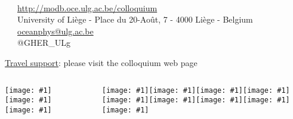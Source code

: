 \documentclass[final,table,14pt,aspectratio=141]{beamer}
\newcommand{\seplogo}{\hspace{.25cm}}
\newcommand{\figheight}{.05\textheight}
\newcommand{\putlogo}[1]{\texttt{[image: \#1]}}
\begin{document}
\begin{frame}[fragile]
\begin{columns}[totalwidth=1.\textwidth,c]
\end{columns}


\vspace{-0.02\textheight}
{ \rmfamily \tiny
\textcolor{greygher}{\faCalendarCheckO~~~\insertdate}\\
\textcolor{bluegher}{{\ComputerMouse}~~~\url{http://modb.oce.ulg.ac.be/colloquium}}\\
\textcolor{greygher}{\faHome~~~University of Liège - Place du 20-Août, 7 - 4000 Liège - Belgium}\\ 
\textcolor{bluegher}{\Letter}~~~\href{mailto:oceanphys@ulg.ac.be}{oceanphys@ulg.ac.be}\\
\textcolor{greygher}{\faTwitter~~~@GHER\_ULg}\\
}

\vspace{.05cm}
{\scriptsize 
{}
}

{\scriptsize 
\href{http://modb.oce.ulg.ac.be/colloquium/2016/#col_travel_grants}{Travel support}: please visit the colloquium web page
}

\vfill

\begin{columns}[totalwidth=1.\textwidth,c]

\scriptsize


\putlogo{logo_gher}\seplogo\putlogo{logo_imedea}\seplogo\putlogo{logo_whoi} %

~

\scriptsize
\putlogo{coq_wallon}\seplogo\putlogo{logo_IOC}\seplogo\putlogo{logoSocib}\seplogo\putlogo{logo_CNES}\seplogo\putlogo{logo_esa}\seplogo \putlogo{logo_nasa}\seplogo\putlogo{logo_onr}\seplogo\putlogo{logo_iugg}\seplogo\putlogo{logo_eumetsat}%

\end{columns}

\end{frame}
\end{document}
